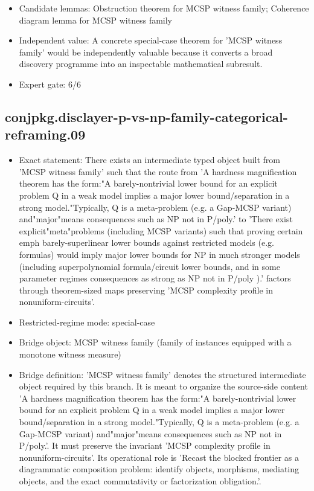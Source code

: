 \documentclass[11pt]{article}
\begin{document}
\begin{itemize}
\item Candidate lemmas: Obstruction theorem for MCSP witness family; Coherence diagram lemma for MCSP witness family
\item Independent value: A concrete special-case theorem for 'MCSP witness family' would be independently valuable because it converts a broad discovery programme into an inspectable mathematical subresult.
\item Expert gate: 6/6
\end{itemize}

\subsection*{conjpkg.disclayer-p-vs-np-family-categorical-reframing.09}
\begin{itemize}
\item Exact statement: There exists an intermediate typed object built from 'MCSP witness family' such that the route from 'A hardness magnification theorem has the form:"A barely-nontrivial lower bound for an explicit problem Q in a weak model implies a major lower bound/separation in a strong model."Typically, Q is a meta-problem (e.g. a Gap-MCSP variant) and"major"means consequences such as NP not in P/poly.' to 'There exist explicit"meta"problems (including MCSP variants) such that proving certain emph barely-superlinear lower bounds against restricted models (e.g. formulas) would imply major lower bounds for NP in much stronger models (including superpolynomial formula/circuit lower bounds, and in some parameter regimes consequences as strong as NP not in P/poly ).' factors through theorem-sized maps preserving 'MCSP complexity profile in nonuniform-circuits'.
\item Restricted-regime mode: special-case
\item Bridge object: MCSP witness family (family of instances equipped with a monotone witness measure)
\item Bridge definition: 'MCSP witness family' denotes the structured intermediate object required by this branch. It is meant to organize the source-side content 'A hardness magnification theorem has the form:"A barely-nontrivial lower bound for an explicit problem Q in a weak model implies a major lower bound/separation in a strong model."Typically, Q is a meta-problem (e.g. a Gap-MCSP variant) and"major"means consequences such as NP not in P/poly.'. It must preserve the invariant 'MCSP complexity profile in nonuniform-circuits'. Its operational role is 'Recast the blocked frontier as a diagrammatic composition problem: identify objects, morphisms, mediating objects, and the exact commutativity or factorization obligation.'.

\end{itemize}
\end{document}
